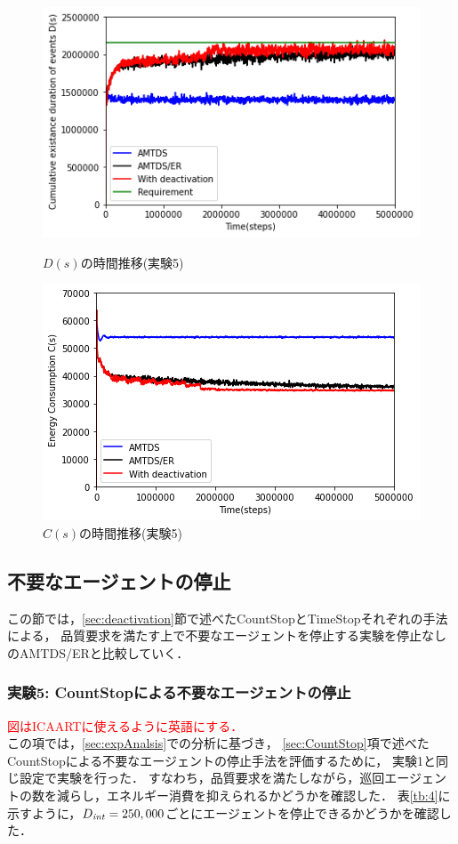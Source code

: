 \documentclass[12pt,a4j,twoside]{jarticle}
\def\DeactCheckInterval{D_{\it int}}
\def\red#1{\textcolor{red}{#1}}
\begin{document}
  \begin{figure}
    \centering
    \includegraphics[width=0.9\hsize]{figures/ds_graph_3600_ave_CountStop_Office_600.png}
    \caption{$D(s)$の時間推移(実験5)}
    \label{fig:ds_CountStop}
    \vspace{12pt}
    \centering
    \includegraphics[width=0.9\hsize]{figures/cs_graph_3600_ave_CountStop_Office_600.png}
    \caption{$C(s)$の時間推移(実験5)}
    \label{fig:cs_CountStop}
  \end{figure}


  \subsection{不要なエージェントの停止}\label{ex:deactivation}
  この節では，\ref{sec:deactivation}節で述べたCountStopとTimeStopそれぞれの手法による，
  品質要求を満たす上で不要なエージェントを停止する実験を停止なしのAMTDS/ERと比較していく．

  \subsubsection{実験5: CountStopによる不要なエージェントの停止}\label{ex:ER5}
  \red{図はICAARTに使えるように英語にする．}\\
  この項では，\ref{sec:expAnalsis}での分析に基づき，
  \ref{sec:CountStop}項で述べたCountStopによる不要なエージェントの停止手法を評価するために，
  実験1と同じ設定で実験を行った．
  すなわち，品質要求を満たしながら，巡回エージェントの数を減らし，エネルギー消費を抑えられるかどうかを確認した．
  表\ref{tb:4}に示すように，$\DeactCheckInterval=250,000$ごとにエージェントを停止できるかどうかを確認した．
  \par
\end{document}
